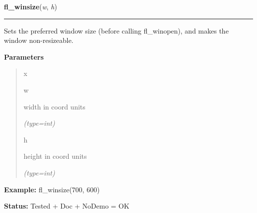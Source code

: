 \hspace{.8\funcindent}\begin{boxedminipage}{\funcwidth}

    \raggedright \textbf{fl\_winsize}(\textit{w}, \textit{h})

    \vspace{-1.5ex}

    \rule{\textwidth}{0.5\fboxrule}
\setlength{\parskip}{2ex}
    Sets the preferred window size (before calling fl\_winopen), and makes 
    the window non-resizeable.

\setlength{\parskip}{1ex}
      \textbf{Parameters}
      \vspace{-1ex}

      \begin{quote}
        \begin{Ventry}{x}

          \item[w]

          width in coord units

            {\it (type=int)}

          \item[h]

          height in coord units

            {\it (type=int)}

        \end{Ventry}

      \end{quote}

\textbf{Example:} fl\_winsize(700, 600)



\textbf{Status:} Tested + Doc + NoDemo = OK



    \end{boxedminipage}

    \label{xformslib:flxbasic:fl_winsize}

    \vspace{0.5ex}

